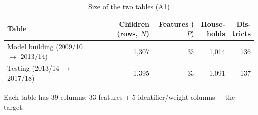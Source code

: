 \documentclass[conference,a4paper]{IEEEtran}
\newcommand{\tabnote}[1]{\par\vspace{3pt}\begin{minipage}{\linewidth}\footnotesize\raggedright #1\end{minipage}}
\begin{document}
\begin{table}[!t]
\centering
\caption{Size of the two tables (A1)}
\label{tab:shape}
\footnotesize
\setlength{\tabcolsep}{4pt}
\begin{tabular}{lrrrr}
\toprule
Table & \makecell{Children\\(rows, $N$)} & \makecell{Features\\($P$)} & \makecell{House-\\holds} & \makecell{Dis-\\tricts} \\
\midrule
\makecell[l]{Model building\\(2009/10 $\rightarrow$ 2013/14)} & 1,307 & 33 & 1,014 & 136 \\
\makecell[l]{Testing\\(2013/14 $\rightarrow$ 2017/18)} & 1,395 & 33 & 1,091 & 137 \\
\bottomrule
\end{tabular}
\tabnote{Each table has 39 columns: 33 features + 5 identifier/weight columns + the target.}
\end{table}
\end{document}
